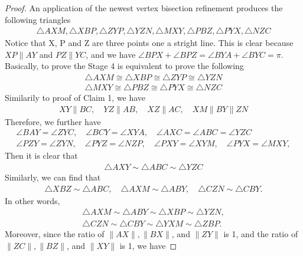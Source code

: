 \begin{proof}
    An application of the newest vertex bisection refinement produces the following triangles
    \begin{align*}
    \triangle{AXM}, \triangle{XBP}, \triangle{ZYP}, \triangle{YZN}, \triangle{MXY}, \triangle{PBZ}, \triangle{PYX}, \triangle{NZC}
    \end{align*}
    Notice that X, P and Z are three points one a stright line. This is clear because $XP\parallel AY$ and $PZ\parallel YC$, and we have $\angle{BPX}+\angle{BPZ} = \angle{BYA}+\angle{BYC} = \pi$. Basically, to prove the Stage 4 is equivalent to prove the following
    \begin{align*}
    \triangle{AXM}\cong\triangle{XBP}\cong\triangle{ZYP}\cong\triangle{YZN}\\
    \triangle{MXY}\cong\triangle{PBZ}\cong\triangle{PYX}\cong\triangle{NZC}
    \end{align*}
    Similarily to proof of Claim 1, we have
    \begin{align*}
    XY\parallel BC,
    \quad
    YZ\parallel AB,
    \quad
    XZ\parallel AC,
    \quad
    XM\parallel BY\parallel ZN
    \end{align*}
    Therefore, we further have 
    \begin{align*}
    \angle{BAY} = \angle{ZYC},
    \quad
    \angle{BCY} = \angle{XYA},
    \quad
    \angle{AXC} = \angle{ABC} = \angle{YZC}\\
    \angle{PZY} = \angle{ZYN},
    \quad
    \angle{PYZ} = \angle{NZP},
    \quad
    \angle{PXY} = \angle{XYM},
    \quad
    \angle{PYX} = \angle{MXY},
    \end{align*}
    Then it is clear that
    \begin{align*}
    \triangle{AXY} \sim \triangle{ABC} \sim \triangle{YZC}
    \end{align*}
    Similarly, we can find that 
    \begin{align*}
    \triangle{XBZ}\sim\triangle{ABC},
    \quad
    \triangle{AXM}\sim\triangle{ABY},
    \quad
    \triangle{CZN}\sim\triangle{CBY}.
    \end{align*}
    In other words, 
    \begin{align*}
    \triangle{AXM}\sim\triangle{ABY}\sim\triangle{XBP}\sim\triangle{YZN},\\
    \triangle{CZN}\sim\triangle{CBY}\sim\triangle{YXM}\sim\triangle{ZBP}.
    \end{align*}
    Moreover, since the ratio of $\|AX\|, \|BX\|$, and $\|ZY\|$ is 1, and the ratio of $\|ZC\|, \|BZ\|$, and $\|XY\|$ is 1, we have

\end{proof}

